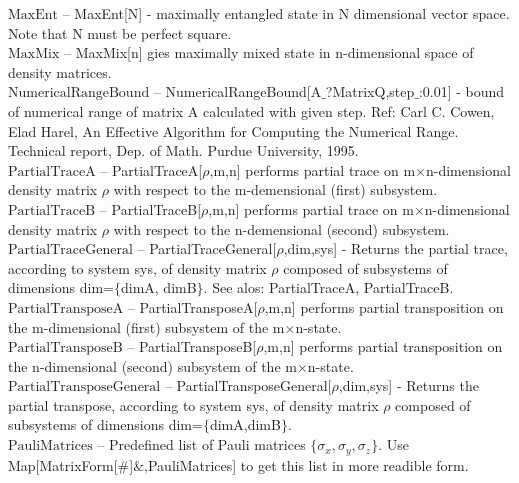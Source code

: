 \documentclass[a4paper,10pt]{scrartcl}
\begin{document}
\textbf{$ \text{MaxEnt} $ }-- MaxEnt[N] - maximally entangled state in N dimensional vector space. Note that N must be perfect square.$  $\\

\textbf{$ \text{MaxMix} $ }-- MaxMix[n] gies maximally mixed state in n-dimensional space of density matrices.$  $\\

\textbf{$ \text{NumericalRangeBound} $ }-- NumericalRangeBound[A$\_$?MatrixQ,step$\_$:0.01] - bound of numerical range of matrix A calculated with given step. Ref: Carl C. Cowen, Elad Harel, An Effective Algorithm for Computing the Numerical Range. Technical report, Dep. of Math. Purdue University, 1995.$  $\\

\textbf{$ \text{PartialTraceA} $ }-- PartialTraceA[$\rho $,m,n] performs partial trace on m$\times $n-dimensional density matrix $\rho $ with respect to the m-demensional (first) subsystem.$  $\\

\textbf{$ \text{PartialTraceB} $ }-- PartialTraceB[$\rho $,m,n] performs partial trace on m$\times $n-dimensional density matrix $\rho $ with respect to the n-demensional (second) subsystem.$  $\\

\textbf{$ \text{PartialTraceGeneral} $ }-- PartialTraceGeneral[$\rho $,dim,sys] - Returns the partial trace, according to system sys, of density matrix $\rho $ composed of subsystems of dimensions dim=$\{$dimA, dimB$\}$. See alos: PartialTraceA, PartialTraceB.$  $\\

\textbf{$ \text{PartialTransposeA} $ }-- PartialTransposeA[$\rho $,m,n] performs partial transposition on the m-dimensional (first) subsystem of the m$\times $n-state.$  $\\

\textbf{$ \text{PartialTransposeB} $ }-- PartialTransposeB[$\rho $,m,n] performs partial transposition on the n-dimensional (second) subsystem of the m$\times $n-state.$  $\\

\textbf{$ \text{PartialTransposeGeneral} $ }-- PartialTransposeGeneral[$\rho $,dim,sys] - Returns the partial transpose, according to system sys, of density matrix $\rho $ composed of subsystems of dimensions dim=$\{$dimA,dimB$\}$. $  $\\

\textbf{$ \text{PauliMatrices} $ }-- Predefined list of Pauli matrices $\{$$ \sigma _x,\sigma _y,\sigma _z $$\}$. Use Map[MatrixForm[$\#$]$\&$,PauliMatrices] to get this list in more readible form.$  $\\
\end{document}
